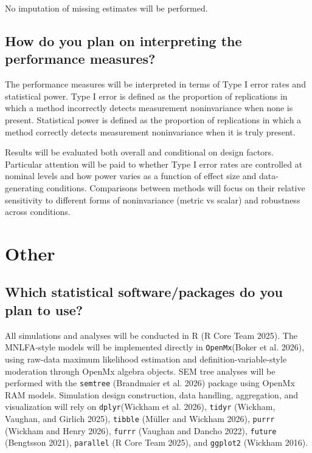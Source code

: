 \documentclass[
  man,
  floatsintext]{apa7}
\begin{document}
No imputation of missing estimates will be performed.

\subsection{How do you plan on interpreting the performance
measures?}\label{how-do-you-plan-on-interpreting-the-performance-measures}

The performance measures will be interpreted in terms of Type I error
rates and statistical power. Type I error is defined as the proportion
of replications in which a method incorrectly detects measurement
noninvariance when none is present. Statistical power is defined as the
proportion of replications in which a method correctly detects
measurement noninvariance when it is truly present.

Results will be evaluated both overall and conditional on design
factors. Particular attention will be paid to whether Type I error rates
are controlled at nominal levels and how power varies as a function of
effect size and data-generating conditions. Comparisons between methods
will focus on their relative sensitivity to different forms of
noninvariance (metric vs scalar) and robustness across conditions.

\section{Other}\label{other}

\subsection{Which statistical software/packages do you plan to
use?}\label{which-statistical-softwarepackages-do-you-plan-to-use}

All simulations and analyses will be conducted in R (R Core Team 2025).
The MNLFA-style models will be implemented directly in
\texttt{OpenMx}(Boker et al. 2026), using raw-data maximum likelihood
estimation and definition-variable-style moderation through OpenMx
algebra objects. SEM tree analyses will be performed with the
\texttt{semtree} (Brandmaier et al. 2026) package using OpenMx RAM
models. Simulation design construction, data handling, aggregation, and
visualization will rely on \texttt{dplyr}(Wickham et al. 2026),
\texttt{tidyr} (Wickham, Vaughan, and Girlich 2025), \texttt{tibble}
(Müller and Wickham 2026), \texttt{purrr} (Wickham and Henry 2026),
\texttt{furrr} (Vaughan and Dancho 2022), \texttt{future} (Bengtsson
2021), \texttt{parallel} (R Core Team 2025), and \texttt{ggplot2}
(Wickham 2016).
\end{document}

